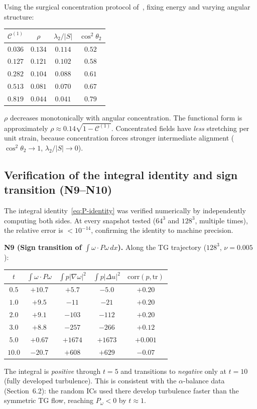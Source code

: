\documentclass[11pt,a4paper]{article}
\theoremstyle{plain}
\theoremstyle{definition}
\theoremstyle{remark}
\begin{document}
Using the surgical concentration protocol
of~\cite{Fontes2026spread}, fixing energy and
varying angular structure:
\begin{center}
\renewcommand{\arraystretch}{1.2}
\begin{tabular}{@{}cccc@{}}
\toprule
$\mathcal{C}^{(1)}$ & $\rho$
  & $\lambda_2/|S|$ & $\cos^2\theta_2$ \\
\midrule
$0.036$ & $0.134$ & $0.114$ & $0.52$ \\
$0.127$ & $0.121$ & $0.102$ & $0.58$ \\
$0.282$ & $0.104$ & $0.088$ & $0.61$ \\
$0.513$ & $0.081$ & $0.070$ & $0.67$ \\
$0.819$ & $0.044$ & $0.041$ & $0.79$ \\
\bottomrule
\end{tabular}
\end{center}
$\rho$ decreases monotonically with angular
concentration.  The functional form is approximately
$\rho\approx 0.14\sqrt{1-\mathcal{C}^{(1)}}$.
Concentrated fields have \emph{less} stretching
per unit strain, because concentration forces
stronger intermediate alignment ($\cos^2\theta_2\to 1$,
$\lambda_2/|S|\to 0$).

\subsection{Verification of the integral identity
and sign transition (N9--N10)}

The integral
identity~\eqref{eq:P-identity} was verified
numerically by independently computing both sides.
At every snapshot tested ($64^3$ and $128^3$,
multiple times), the relative error is
$<10^{-14}$, confirming the identity to machine
precision.

\textbf{N9 (Sign transition of
$\int\omega\cdot P\omega\,dx$).}
Along the TG trajectory ($128^3$, $\nu=0.005$):
\begin{center}
\renewcommand{\arraystretch}{1.2}
\begin{tabular}{@{}ccccc@{}}
\toprule
$t$ & $\int\omega\cdot P\omega$
  & $\int p|\nabla\omega|^2$
  & $\int p|\Delta u|^2$
  & $\mathrm{corr}(p,\mathrm{tr})$ \\
\midrule
$0.5$ & $+10.7$ & $+5.7$ & $-5.0$ & $+0.20$ \\
$1.0$ & $+9.5$ & $-11$ & $-21$ & $+0.20$ \\
$2.0$ & $+9.1$ & $-103$ & $-112$ & $+0.20$ \\
$3.0$ & $+8.8$ & $-257$ & $-266$ & $+0.12$ \\
$5.0$ & $+0.67$ & $+1674$ & $+1673$ & $+0.001$ \\
$10.0$ & $\mathbf{-20.7}$ & $+608$ & $+629$ & $-0.07$ \\
\bottomrule
\end{tabular}
\end{center}
The integral is \emph{positive} through $t=5$ and
transitions to \emph{negative} only at $t=10$
(fully developed turbulence).  This is consistent
with the $\alpha$-balance data (Section~6.2): the
random ICs used there develop turbulence faster
than the symmetric TG flow, reaching $P_\omega<0$
by $t\approx 1$.
\end{document}
